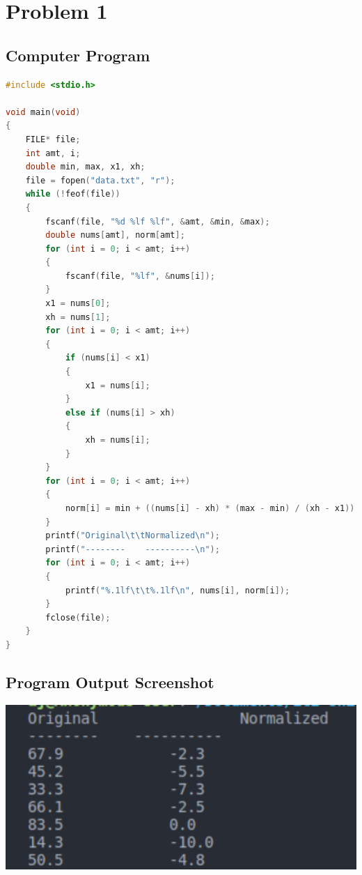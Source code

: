 {}

\section{{Problem 1}}

	\subsection{{Computer Program}}

		\begin{lstlisting}[language=C, caption=\textit{}]
#include <stdio.h>

void main(void)
{
    FILE* file;
    int amt, i;
    double min, max, x1, xh;
    file = fopen("data.txt", "r");
    while (!feof(file))
    {
        fscanf(file, "%d %lf %lf", &amt, &min, &max);
        double nums[amt], norm[amt];
        for (int i = 0; i < amt; i++)
        {
            fscanf(file, "%lf", &nums[i]);
        }
        x1 = nums[0];
        xh = nums[1];
        for (int i = 0; i < amt; i++)
        {
            if (nums[i] < x1)
            {
                x1 = nums[i];
            }
            else if (nums[i] > xh)
            {
                xh = nums[i];
            }            
        }
        for (int i = 0; i < amt; i++)
        {
            norm[i] = min + ((nums[i] - xh) * (max - min) / (xh - x1));
        }
        printf("Original\t\tNormalized\n");
        printf("--------    ----------\n");
        for (int i = 0; i < amt; i++)
        {
            printf("%.1lf\t\t%.1lf\n", nums[i], norm[i]);
        }
        fclose(file);
    }
}


\end{lstlisting}

	\subsection{{Program Output Screenshot}}

		\includegraphics[width=15cm]{problem1.png}
		
